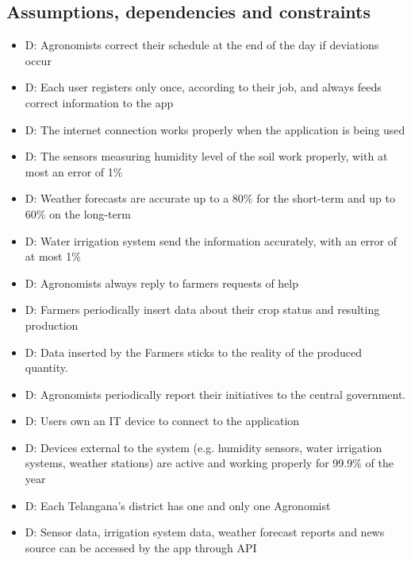 \documentclass[table, 12pt]{article}
\begin{document}
\subsection{Assumptions, dependencies and constraints}
\begin{itemize}
    \item {}D: Agronomists correct their schedule at the end of the day if deviations occur
    \item {}D: Each user registers only once, according to their job, and always feeds correct information to the app
    \item {}D: The internet connection works properly when the application is being used\footnotemark
    \item {}D: The sensors measuring humidity level of the soil work properly, with at most an error of 1\%
    \item {}D: Weather forecasts are accurate up to a 80\% for the short-term and up to 60\% on the long-term
    \item {}D: Water irrigation system send the information accurately, with an error of at most 1\%
    \item {}D: Agronomists always reply to farmers requests of help
    \item {}D: Farmers periodically insert data about their crop status and resulting production
    \item {}D: Data inserted by the Farmers sticks to the reality of the produced quantity.
    \item {}D: Agronomists periodically report their initiatives to the central government.
    \item {}D: Users own an IT device to connect to the application
    \item {}D: Devices external to the system (e.g. humidity sensors, water irrigation systems, weather stations) are active and working properly for 99.9\% of the year
    \item {}D: Each Telangana's district has one and only one Agronomist\footnotemark[\value{footnote}]
    \item {}D: Sensor data, irrigation system data, weather forecast reports and news source can be accessed by the app through API
\end{itemize}
\end{document}
